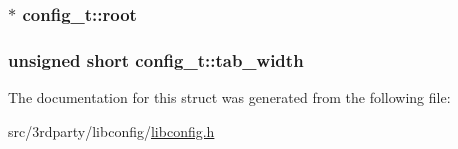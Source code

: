 \hypertarget{structconfig__t_a32f9518ccc7f8a65b5f794fc9d38a565}{
\subsubsection[{root}]{$\ast$ config\-\_\-t\-::root}}\label{structconfig__t_a32f9518ccc7f8a65b5f794fc9d38a565}
\hypertarget{structconfig__t_aaa1a237aeadf1111eaac6946b252c227}{
\subsubsection[{tab\-\_\-width}]{\setlength{\rightskip}{0pt plus 5cm}unsigned short config\-\_\-t\-::tab\-\_\-width}}\label{structconfig__t_aaa1a237aeadf1111eaac6946b252c227}


The documentation for this struct was generated from the following file\-:\begin{DoxyCompactItemize}
\item 
src/3rdparty/libconfig/\hyperlink{libconfig_8h}{libconfig.\-h}\end{DoxyCompactItemize}
